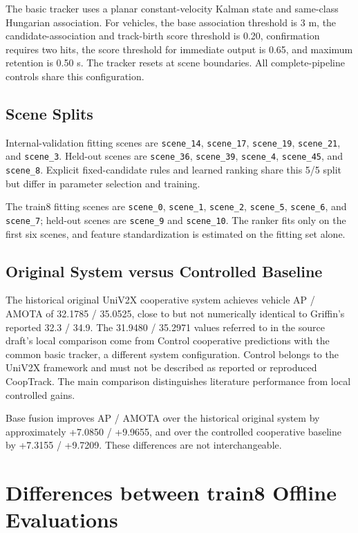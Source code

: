 The basic tracker uses a planar constant-velocity Kalman state and same-class Hungarian association. For vehicles, the base association threshold is 3 m, the candidate-association and track-birth score threshold is 0.20, confirmation requires two hits, the score threshold for immediate output is 0.65, and maximum retention is 0.50 s. The tracker resets at scene boundaries. All complete-pipeline controls share this configuration.

\subsection{Scene Splits}

Internal-validation fitting scenes are \texttt{scene\_14}, \texttt{scene\_17}, \texttt{scene\_19}, \texttt{scene\_21}, and \texttt{scene\_3}. Held-out scenes are \texttt{scene\_36}, \texttt{scene\_39}, \texttt{scene\_4}, \texttt{scene\_45}, and \texttt{scene\_8}. Explicit fixed-candidate rules and learned ranking share this 5/5 split but differ in parameter selection and training.

The train8 fitting scenes are \texttt{scene\_0}, \texttt{scene\_1}, \texttt{scene\_2}, \texttt{scene\_5}, \texttt{scene\_6}, and \texttt{scene\_7}; held-out scenes are \texttt{scene\_9} and \texttt{scene\_10}. The ranker fits only on the first six scenes, and feature standardization is estimated on the fitting set alone.

\subsection{Original System versus Controlled Baseline}

The historical original UniV2X cooperative system achieves vehicle AP / AMOTA of 32.1785 / 35.0525, close to but not numerically identical to Griffin's reported 32.3 / 34.9. The 31.9480 / 35.2971 values referred to in the source draft's local comparison come from Control cooperative predictions with the common basic tracker, a different system configuration. Control belongs to the UniV2X framework and must not be described as reported or reproduced CoopTrack. The main comparison distinguishes literature performance from local controlled gains.

Base fusion improves AP / AMOTA over the historical original system by approximately +7.0850 / +9.9655, and over the controlled cooperative baseline by +7.3155 / +9.7209. These differences are not interchangeable.

\section{Differences between train8 Offline Evaluations}


